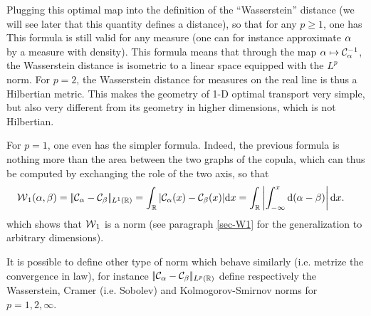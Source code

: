 Plugging this optimal map into the definition of the ``Wasserstein'' distance (we will see later that this quantity defines a distance), so that for any $p \geq 1$, one has
This formula is still valid for any measure (one can for instance approximate $\alpha$ by a measure with density). 
%
This formula means that through the map $\alpha \mapsto \mathcal{C}_{\alpha}^{-1}$, the Wasserstein distance is isometric to a linear space equipped with the $L^p$ norm. For $p=2$, the Wasserstein distance for measures on the real line is thus a Hilbertian metric. 
This makes the geometry of 1-D optimal transport very simple, but also very different from its geometry in higher dimensions, which is not Hilbertian.

For $p=1$, one even has the simpler formula. Indeed, the previous formula is nothing more than the area between the two graphs of the copula, which can thus be computed by exchanging the role of the two axis, so that 
\begin{align}\label{eq-w1-1d}
	\operatorname{\mathcal{W}}_1(\alpha,\beta) &= |\!|  \mathcal{C}_{\alpha} - \mathcal{C}_{\beta}  |\!|_{L^1(\mathbb{R})} = 
	\int_{\mathbb{R}} | \mathcal{C}_{\alpha}(x) - \mathcal{C}_{\beta}(x) | \mathrm{d} x 
	= \int_{\mathbb{R}} \left\lvert \int_{-\infty}^x \mathrm{d}(\alpha-\beta) \right\rvert \mathrm{d} x.
\end{align}
which shows that $\operatorname{\mathcal{W}}_1$ is a norm (see paragraph \ref{sec-W1} for the generalization to arbitrary dimensions). 

It is possible to define other type of norm which behave similarly (i.e. metrize the convergence in law), for instance $|\!|  \mathcal{C}_{\alpha} - \mathcal{C}_{\beta}  |\!|_{L^p(\mathbb{R})}$ define respectively the Wasserstein, Cramer (i.e. Sobolev) and Kolmogorov-Smirnov norms for $p=1,2,\infty$. 





